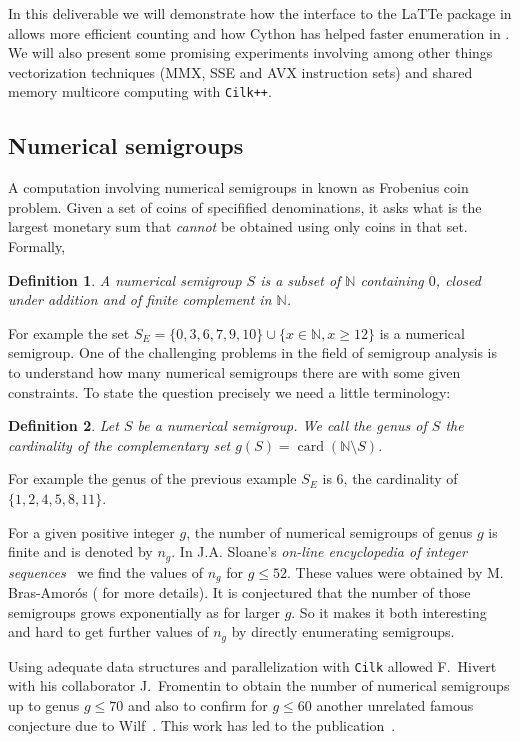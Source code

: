 \documentclass{deliverablereport}
\newcommand{\Cilk}{\texttt{Cilk}\xspace}
\newcommand{\CilkP}{\texttt{Cilk++}\xspace}
\newcommand{\NN}{\mathbb{N}}
\newtheorem{defi}{Definition}
\begin{document}
In this deliverable we will demonstrate how the interface to the LaTTe package
in \Sage allows more efficient counting and how Cython has helped faster enumeration
in \Sage. We will also present some promising experiments involving among
other things vectorization techniques (MMX, SSE and AVX instruction sets) and
shared memory multicore computing with \CilkP.

\subsection{Numerical semigroups}

A computation involving numerical semigroups in known as Frobenius coin
problem.  Given a set of coins of specifified denominations, it asks what is
the largest monetary sum that {\em cannot} be obtained using only coins in that
set. Formally,
\begin{defi}
  A \emph{numerical semigroup} $S$ is a subset of $\NN$ containing $0$, closed
  under addition and of finite complement in $\NN$.
\end{defi}
For example the set $S_E=\{0,3,6,7,9,10\}\cup\{x\in\NN, x\geq 12\}$
is a numerical semigroup. One of the challenging problems in the field of
semigroup analysis is to understand how many numerical semigroups there are with some
given constraints. To state the question precisely we need a little
terminology:
\begin{defi}
  Let $S$ be a numerical semigroup. We call the \emph{genus} of $S$ the
  cardinality of the complementary set $g(S)=\operatorname{card}(\NN\setminus
  S)$.
\end{defi}
For example the genus of the previous example $S_E$ is $6$, the cardinality of
$\{1,2,4,5,8,11\}$.

For a given positive integer $g$, the number of numerical semigroups of genus
$g$ is finite and is denoted by $n_g$. In J.A. Sloane's \emph{on-line
encyclopedia of integer sequences}~\cite{OEIS} we find the values of $n_g$
for $g\leq 52$. These values were obtained by M. Bras-Amor\'os
(\cite{BrasAmoros2008} for more details). It is conjectured that the number of
those semigroups grows exponentially as for larger $g$. So it makes it both interesting and hard
to get further values of $n_g$ by directly enumerating semigroups.

Using adequate data structures and parallelization with \Cilk allowed
F.~Hivert with his collaborator J.~Fromentin to obtain the number of numerical
semigroups up to genus $g \leq 70$ and also to confirm for $g\leq 60$ another
unrelated famous conjecture due to Wilf~\cite{Wilf}. This work has led to the
publication~\cite{FromentinH16}.
\end{document}
